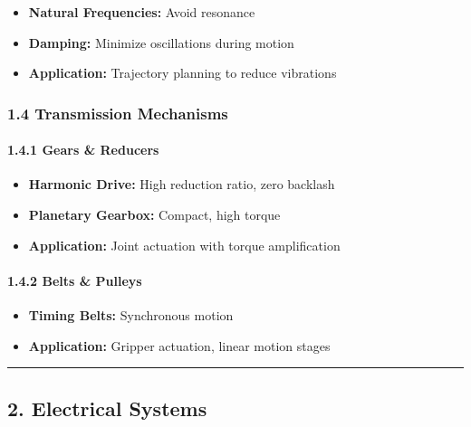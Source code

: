 \documentclass[
]{article}
\providecommand{\tightlist}{%
  \setlength{\itemsep}{0pt}\setlength{\parskip}{0pt}}
\begin{document}
\begin{itemize}
\tightlist
\item
  \textbf{Natural Frequencies:} Avoid resonance
\item
  \textbf{Damping:} Minimize oscillations during motion
\item
  \textbf{Application:} Trajectory planning to reduce vibrations
\end{itemize}

\hypertarget{transmission-mechanisms}{%
\subsubsection{1.4 Transmission
Mechanisms}\label{transmission-mechanisms}}

\hypertarget{gears-reducers}{%
\paragraph{1.4.1 Gears \& Reducers}\label{gears-reducers}}

\begin{itemize}
\tightlist
\item
  \textbf{Harmonic Drive:} High reduction ratio, zero backlash
\item
  \textbf{Planetary Gearbox:} Compact, high torque
\item
  \textbf{Application:} Joint actuation with torque amplification
\end{itemize}

\hypertarget{belts-pulleys}{%
\paragraph{1.4.2 Belts \& Pulleys}\label{belts-pulleys}}

\begin{itemize}
\tightlist
\item
  \textbf{Timing Belts:} Synchronous motion
\item
  \textbf{Application:} Gripper actuation, linear motion stages
\end{itemize}

\begin{center}\rule{0.5\linewidth}{0.5pt}\end{center}

\hypertarget{electrical-systems}{%
\subsection{2. Electrical Systems}\label{electrical-systems}}
\end{document}
